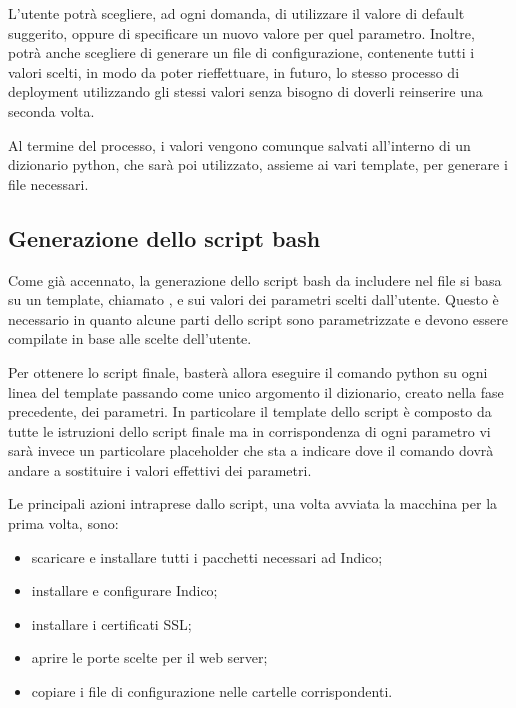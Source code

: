            L'utente potrà scegliere, ad ogni domanda, di utilizzare il valore di default suggerito, oppure di specificare un nuovo valore per quel parametro. Inoltre, potrà anche scegliere di generare un file di configurazione, contenente tutti i valori scelti, in modo da poter rieffettuare, in futuro, lo stesso processo di deployment utilizzando gli stessi valori senza bisogno di doverli reinserire una seconda volta.
            
            Al termine del processo, i valori vengono comunque salvati all'interno di un dizionario python, che sarà poi utilizzato, assieme ai vari template, per generare i file necessari.
        
        \subsection{Generazione dello script bash} \label{subsec:cd;dci;generazione_script_bash}
        
            Come già accennato, la generazione dello script bash da includere nel file  si basa su un template, chiamato , e sui valori dei parametri scelti dall'utente. Questo è necessario in quanto alcune parti dello script sono parametrizzate e devono essere compilate in base alle scelte dell'utente.
            
            Per ottenere lo script finale, basterà allora eseguire il comando python  su ogni linea del template passando come unico argomento il dizionario, creato nella fase precedente, dei parametri. In particolare il template dello script è composto da tutte le istruzioni dello script finale ma in corrispondenza di ogni parametro vi sarà invece un particolare placeholder che sta a indicare dove il comando  dovrà andare a sostituire i valori effettivi dei parametri.
            
            Le principali azioni intraprese dallo script, una volta avviata la macchina per la prima volta, sono:
            
            \begin{itemize}
                \item scaricare e installare tutti i pacchetti necessari ad Indico;
                \item installare e configurare Indico;
                \item installare i certificati \ac{SSL};
                \item aprire le porte scelte per il web server;
                \item copiare i file di configurazione nelle cartelle corrispondenti.
            \end{itemize}
            
